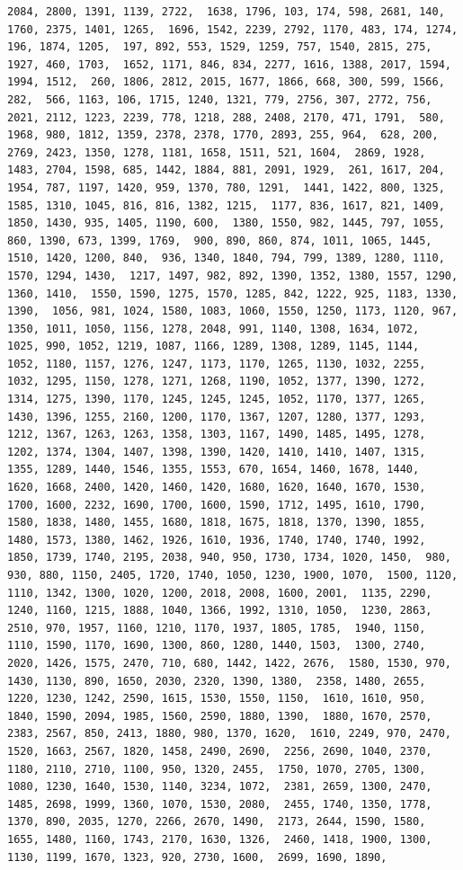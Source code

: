 \documentclass[
]{article}
\begin{document}
\begin{verbatim}
2084, 2800, 1391, 1139, 2722,  1638, 1796, 103, 174, 598, 2681, 140, 1760, 2375, 1401, 1265,  1696, 1542, 2239, 2792, 1170, 483, 174, 1274, 196, 1874, 1205,  197, 892, 553, 1529, 1259, 757, 1540, 2815, 275, 1927, 460, 1703,  1652, 1171, 846, 834, 2277, 1616, 1388, 2017, 1594, 1994, 1512,  260, 1806, 2812, 2015, 1677, 1866, 668, 300, 599, 1566, 282,  566, 1163, 106, 1715, 1240, 1321, 779, 2756, 307, 2772, 756,  2021, 2112, 1223, 2239, 778, 1218, 288, 2408, 2170, 471, 1791,  580, 1968, 980, 1812, 1359, 2378, 2378, 1770, 2893, 255, 964,  628, 200, 2769, 2423, 1350, 1278, 1181, 1658, 1511, 521, 1604,  2869, 1928, 1483, 2704, 1598, 685, 1442, 1884, 881, 2091, 1929,  261, 1617, 204, 1954, 787, 1197, 1420, 959, 1370, 780, 1291,  1441, 1422, 800, 1325, 1585, 1310, 1045, 816, 816, 1382, 1215,  1177, 836, 1617, 821, 1409, 1850, 1430, 935, 1405, 1190, 600,  1380, 1550, 982, 1445, 797, 1055, 860, 1390, 673, 1399, 1769,  900, 890, 860, 874, 1011, 1065, 1445, 1510, 1420, 1200, 840,  936, 1340, 1840, 794, 799, 1389, 1280, 1110, 1570, 1294, 1430,  1217, 1497, 982, 892, 1390, 1352, 1380, 1557, 1290, 1360, 1410,  1550, 1590, 1275, 1570, 1285, 842, 1222, 925, 1183, 1330, 1390,  1056, 981, 1024, 1580, 1083, 1060, 1550, 1250, 1173, 1120, 967,  1350, 1011, 1050, 1156, 1278, 2048, 991, 1140, 1308, 1634, 1072,  1025, 990, 1052, 1219, 1087, 1166, 1289, 1308, 1289, 1145, 1144,  1052, 1180, 1157, 1276, 1247, 1173, 1170, 1265, 1130, 1032, 2255,  1032, 1295, 1150, 1278, 1271, 1268, 1190, 1052, 1377, 1390, 1272,  1314, 1275, 1390, 1170, 1245, 1245, 1245, 1052, 1170, 1377, 1265,  1430, 1396, 1255, 2160, 1200, 1170, 1367, 1207, 1280, 1377, 1293,  1212, 1367, 1263, 1263, 1358, 1303, 1167, 1490, 1485, 1495, 1278,  1202, 1374, 1304, 1407, 1398, 1390, 1420, 1410, 1410, 1407, 1315,  1355, 1289, 1440, 1546, 1355, 1553, 670, 1654, 1460, 1678, 1440,  1620, 1668, 2400, 1420, 1460, 1420, 1680, 1620, 1640, 1670, 1530,  1700, 1600, 2232, 1690, 1700, 1600, 1590, 1712, 1495, 1610, 1790,  1580, 1838, 1480, 1455, 1680, 1818, 1675, 1818, 1370, 1390, 1855,  1480, 1573, 1380, 1462, 1926, 1610, 1936, 1740, 1740, 1740, 1992,  1850, 1739, 1740, 2195, 2038, 940, 950, 1730, 1734, 1020, 1450,  980, 930, 880, 1150, 2405, 1720, 1740, 1050, 1230, 1900, 1070,  1500, 1120, 1110, 1342, 1300, 1020, 1200, 2018, 2008, 1600, 2001,  1135, 2290, 1240, 1160, 1215, 1888, 1040, 1366, 1992, 1310, 1050,  1230, 2863, 2510, 970, 1957, 1160, 1210, 1170, 1937, 1805, 1785,  1940, 1150, 1110, 1590, 1170, 1690, 1300, 860, 1280, 1440, 1503,  1300, 2740, 2020, 1426, 1575, 2470, 710, 680, 1442, 1422, 2676,  1580, 1530, 970, 1430, 1130, 890, 1650, 2030, 2320, 1390, 1380,  2358, 1480, 2655, 1220, 1230, 1242, 2590, 1615, 1530, 1550, 1150,  1610, 1610, 950, 1840, 1590, 2094, 1985, 1560, 2590, 1880, 1390,  1880, 1670, 2570, 2383, 2567, 850, 2413, 1880, 980, 1370, 1620,  1610, 2249, 970, 2470, 1520, 1663, 2567, 1820, 1458, 2490, 2690,  2256, 2690, 1040, 2370, 1180, 2110, 2710, 1100, 950, 1320, 2455,  1750, 1070, 2705, 1300, 1080, 1230, 1640, 1530, 1140, 3234, 1072,  2381, 2659, 1300, 2470, 1485, 2698, 1999, 1360, 1070, 1530, 2080,  2455, 1740, 1350, 1778, 1370, 890, 2035, 1270, 2266, 2670, 1490,  2173, 2644, 1590, 1580, 1655, 1480, 1160, 1743, 2170, 1630, 1326,  2460, 1418, 1900, 1300, 1130, 1199, 1670, 1323, 920, 2730, 1600,  2699, 1690, 1890, 
\end{verbatim}
\end{document}
